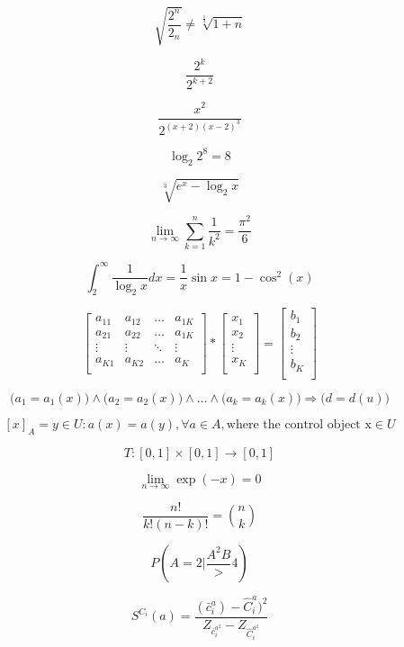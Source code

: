 \documentclass[a4paper]{article}
\begin{document}
\begin{center}
$$ \sqrt{ \frac{2^{n}}{2_n}} \neq \sqrt[\frac{1}{3}]{1+n} $$

$$   \frac{2^{k}}{2^{k+2} } $$

$$   \frac{x^{2}}{2^{(x+2)(x-2)^{3}} } $$ 

$$   \log_{2}2^{8} = 8 $$

$$ \sqrt[3]{e^{x} - \log_2x } $$

$$ \lim_{n\to \infty} \sum_{k=1}^{n}\frac{1}{k^{2}} = \frac{\pi^{2}}{6}  $$ 

$$ \int_{2}^{\infty}  \frac{1}{\log_2x} dx = \frac{1}{x}  \sin x = 1 - \cos^{2}(x) $$

$$
\left[ \begin{array}{cccc}
a_{11} & a_{12} & \ldots & a_{1K} \\
a_{21} & a_{22} & \ldots & a_{1K}  \\
\vdots & \vdots & \ddots &  \vdots \\
a_{K1} &  a_{K2} & \ldots  & a_{K} \\
\end{array} \right]  * 
 \left[ \begin{array}{cccc}
x_{1} \\
x_{2} \\
\vdots \\
x_{K} \\
\end{array} \right]  =
\left[ \begin{array}{cccc}
b_{1} \\
b_{2} \\
\vdots \\
b_{K} \\
\end{array} \right] $$

$$ \big( a_{1} = a_{1}(x) \big) \wedge \big( a_{2} = a_{2}(x) \big) \wedge  \ldots   \wedge  \big( a_{k} = a_{k}(x) \big) \Rightarrow \big( d = d(u) \big)   $$


$$ [x]_A = {y \in U : a(x) = a(y), \forall a \in A}, \text{where the control object x} \in U $$

$$ T:[0,1] \times [0,1] \rightarrow [0,1] $$

$$ \lim_{n\to \infty} \exp(-x)=0 $$ 

$$   \frac{n!}{k!(n - k)!} = \binom{n}{k}$$ 

$$ P \left(A = 2  \bigg| \frac{A^{2}{B}} > 4 \right) $$

$$ S^{C_i} (a) = \frac{(\bar{c}^a_i) - \hat{C}^a_i)^2}{Z_{\bar{c}_i^{a^2}} - Z_{\hat{C}_i^{a^2}}} $$


\end{center}
\end{document}
